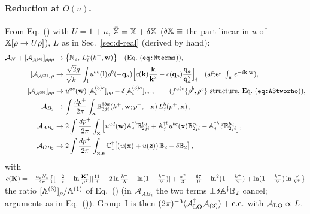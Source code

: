 \paragraph{Reduction at $O(u)$.} From Eq.~() with $U=1+u$, $\bar{\mathbb{X}}=\mathbb{X}+\delta\mathbb{X}$ ($\delta\mathbb{X}\equiv$ the part linear in $u$ of $\mathbb{X}[\rho\to U\rho]$), $L$ as in Sec.~\ref{sec:d-real} (derived by hand):
\begin{align}
\mathcal A_N+[\mathcal A_{A^{(3)}}]_{\rho\rho\rho}&\to\big\{\mf N_2,\,L^a_i(k^+,\v w)\big\}\quad(\text{Eq.~(\dref{eq:Nterms})}),\notag\\
[\mathcal A_{A^{(3)}}]_{\rho}&\to\frac{\sqrt2 g}{\sqrt{k^+}}\int_{\v l}u^{ab}(\v l)\rho^b(-\v q_a)\Big[c(\v k)\frac{\v k}{\v k^2}-c(\v q_a)\frac{\v q_a}{\v q_a^2}\Big]_i\quad(\text{after }\textstyle\int_we^{-i\v k\cdot\v w}),\notag\\
[\mathcal A_{A^{(3)}}]_{\rho\rho}&\to u^{ac}(\v w)\,[\mf A^{(3)c}_{i}]_{\rho\rho}-\delta[\mf A^{(3)a}_{i}]_{\rho\rho}\,,\qquad(f^{abc}\{\rho^b,\rho^c\}\ \text{structure, Eq.~(\dref{eq:A3tworho})}),\notag\\
\mathcal A_{B_3}&\to\int\frac{dp^+}{2\pi}\int_{\v x}\mf B^{\dagger ba}_{3ji}(k^+,\v w;p^+,-\v x)\,L^b_j(p^+,\v x)\,,\notag\\
\mathcal A_{AB_2}&\to2\int\frac{dp^+}{2\pi}\int_{\v x}\Big[u^{ad}(\v w)\mf A^{\dagger b}_j\mf B^{bd}_{2ji}+\mf A^{\dagger b}_ju^{bc}(\v x)\mf B^{ca}_{2ji}-\mf A^{\dagger b}_j\,\delta\mf B^{ba}_{2ji}\Big],\notag\\
\mathcal A_{CB_2}&\to2\int\frac{dp^+}{2\pi}\int_{\v x,\v z}\mf C^{\dagger}_1\big[(u(\v x)+u(\v z))\,\mf B_2-\delta\mf B_2\big]\,,\label{d:virtred}
\end{align}
with $c(\mathbf{K})=-\frac{\alpha_sN_c}{4\pi}\big\{[-\frac2\epsilon+\ln\frac{\mathbf{K}^2}{\mu^2}][\frac{11}{3}-2\ln\frac{k^+}{\Lambda}+\ln(1-\frac{k^+}{\vee})]+\frac{\pi^2}{3}-\frac{67}{9}+\ln^2(1-\frac{k^+}{\vee})+\ln(1-\frac{k^+}{\vee})\ln\frac{\vee}{k^+}\big\}$ the ratio $[\mathbb{A}^{(3)}]_\rho/\mathbb{A}^{(1)}$ of Eq.~() (in $\mathcal A_{AB_2}$ the two terms $\pm\delta\mathbb{A}^\dagger\mathbb{B}_2$ cancel; arguments as in Eq.~()). Group~I is then $(2\pi)^{-3}\langle\mathcal A^\dagger_{\rm LO}\mathcal A_{(3)}\rangle+{\rm c.c.}$ with $\mathcal A_{\rm LO}\propto L$.

